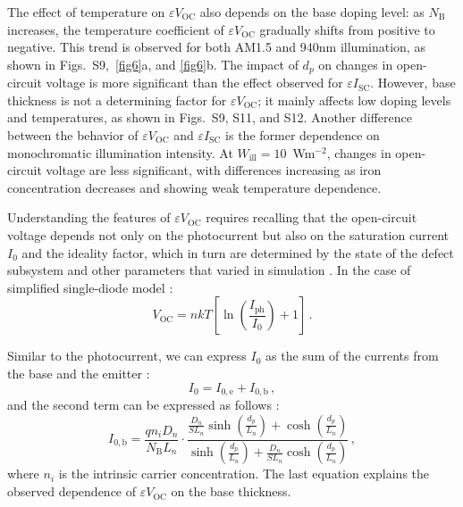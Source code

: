 \documentclass[a4paper,fleqn]{cas-sc}
\begin{document}
The effect of temperature on $\varepsilon V_\mathrm{OC}$ also depends on the base doping level:
as $N_\mathrm{B}$ increases, the temperature coefficient of $\varepsilon V_\mathrm{OC}$ gradually shifts from positive to negative.
This trend is observed for both AM1.5 and 940nm illumination, as shown in Figs.~S9,~\ref{fig6}a, and \ref{fig6}b.
The impact of $d_p$ on changes in open-circuit voltage is more significant than the effect observed for $\varepsilon I_\mathrm{SC}$.
However, base thickness is not a determining factor for $\varepsilon V_\mathrm{OC}$;
it mainly affects low doping levels and temperatures, as shown in Figs.~S9, S11, and S12.
Another difference between the behavior of $\varepsilon V_\mathrm{OC}$ and $\varepsilon I_\mathrm{SC}$
is the former dependence on monochromatic illumination intensity.
At $W_\mathrm{ill} = 10$~Wm$^{-2}$, changes in open-circuit voltage are less significant,
with differences increasing as iron concentration decreases and showing weak temperature dependence.

Understanding the features of $\varepsilon V_\mathrm{OC}$ requires recalling
that the open-circuit voltage depends not only on the photocurrent
but also on the saturation current $I_0$ and the ideality factor,
which in turn are determined by the state of the defect subsystem and other parameters
that varied in simulation \cite{Olikh2019SM,YangHandbookPVSi}.
In the case of simplified single-diode model \cite{YangHandbookPVSi}:
\begin{equation}
\label{eq5}
     V_\mathrm{OC} = nkT\left[ {\ln\left( {\frac{I_\mathrm{ph}}{I_0}} \right)+1} \right]\,.
\end{equation}

Similar to the photocurrent, we can express $I_\mathrm{0}$ as the sum of the currents from the base and the emitter \cite{Markvart}:
\begin{equation}
\label{eq6}
     I_0 = I_\mathrm{0,e}+I_\mathrm{0,b}\,,
\end{equation}
and the second term can be expressed as follows \cite{Goetzberger1998}:
\begin{equation}
\label{eq7}
     I_\mathrm{0,b}=\frac{qn_i D_n}{N_\mathrm{B}L_n}\cdot\frac{\frac{D_n}{SL_n}\sinh\left( \frac{d_p}{L_n} \right)+\cosh\left( \frac{d_p}{L_n} \right)}{\sinh\left( \frac{d_p}{L_n} \right)+\frac{D_n}{SL_n}\cosh\left( \frac{d_p}{L_n} \right)}\,,
\end{equation}
where
$n_i$ is the intrinsic carrier concentration.
The last equation explains the observed dependence of $\varepsilon V_\mathrm{OC}$ on the base thickness.
\end{document}
